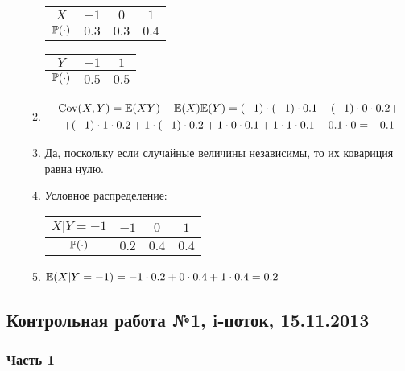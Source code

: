 \begin{enumerate}
\begin{enumerate}
\begin{tabular}{@{}cccc@{}}
\toprule
$X$         & $-1$  & $0$   & $1$   \\ \midrule
$\P(\cdot)$ & $0.3$ & $0.3$ & $0.4$ \\ \bottomrule
\end{tabular}
\hspace{1cm}
\begin{tabular}{@{}ccc@{}}
\toprule
$Y$         & $-1$  & $1$   \\ \midrule
$\P(\cdot)$ & $0.5$ & $0.5$ \\ \bottomrule
\end{tabular}
\item
\begin{multline*}
\Cov(X, Y) = \E(XY) - \E(X) \E(Y)  = (-1)\cdot (-1) \cdot 0.1 + (-1) \cdot 0 \cdot 0.2 + \\
+ (-1) \cdot 1 \cdot 0.2 + 1 \cdot (-1) \cdot 0.2 + 1 \cdot 0 \cdot 0.1 + 1 \cdot 1 \cdot 0.1 -
0.1 \cdot 0 = -0.1
\end{multline*}
\item Да, поскольку если случайные величины независимы, то их ковариция равна нулю.
\item Условное распределение:

\begin{tabular}{@{}cccc@{}}
\toprule
$X|Y=-1$    & $-1$  & $0$   & $1$   \\ \midrule
$\P(\cdot)$ & $0.2$ & $0.4$ & $0.4$ \\ \bottomrule
\end{tabular}
\item $\E(X | Y = -1) = -1 \cdot 0.2 + 0 \cdot 0.4 + 1 \cdot 0.4 = 0.2$
\end{enumerate}
\end{enumerate}



\subsection{Контрольная работа №1, i-поток, 15.11.2013}

\subsubsection*{Часть 1}

